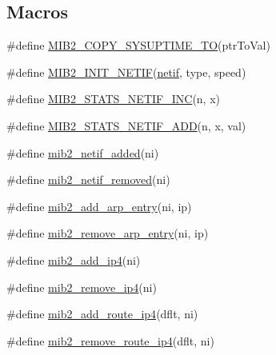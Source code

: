 \subsection*{Macros}
\begin{DoxyCompactItemize}
\item 
\#define \hyperlink{openmote-cc2538_2lwip_2src_2include_2lwip_2snmp_8h_abe6b270482ca9af07c029f3136d8ec9c}{M\+I\+B2\+\_\+\+C\+O\+P\+Y\+\_\+\+S\+Y\+S\+U\+P\+T\+I\+M\+E\+\_\+\+TO}(ptr\+To\+Val)
\item 
\#define \hyperlink{openmote-cc2538_2lwip_2src_2include_2lwip_2snmp_8h_a5be1b8cba1d67bf6e7f8851ec91b10f0}{M\+I\+B2\+\_\+\+I\+N\+I\+T\+\_\+\+N\+E\+T\+IF}(\hyperlink{structnetif}{netif},  type,  speed)
\item 
\#define \hyperlink{openmote-cc2538_2lwip_2src_2include_2lwip_2snmp_8h_a3c52caf566d37705c6547f2d025afd9f}{M\+I\+B2\+\_\+\+S\+T\+A\+T\+S\+\_\+\+N\+E\+T\+I\+F\+\_\+\+I\+NC}(n,  x)
\item 
\#define \hyperlink{openmote-cc2538_2lwip_2src_2include_2lwip_2snmp_8h_a05641438775014b7e13b9e55eba48bed}{M\+I\+B2\+\_\+\+S\+T\+A\+T\+S\+\_\+\+N\+E\+T\+I\+F\+\_\+\+A\+DD}(n,  x,  val)
\item 
\#define \hyperlink{openmote-cc2538_2lwip_2src_2include_2lwip_2snmp_8h_a08c13574be94c2bd589c476bd0ea1ba0}{mib2\+\_\+netif\+\_\+added}(ni)
\item 
\#define \hyperlink{openmote-cc2538_2lwip_2src_2include_2lwip_2snmp_8h_a8199a60f5794825ce5d9d03fa6d09ce8}{mib2\+\_\+netif\+\_\+removed}(ni)
\item 
\#define \hyperlink{openmote-cc2538_2lwip_2src_2include_2lwip_2snmp_8h_adb03de79d2e1fc600c78d8f72a757f34}{mib2\+\_\+add\+\_\+arp\+\_\+entry}(ni,  ip)
\item 
\#define \hyperlink{openmote-cc2538_2lwip_2src_2include_2lwip_2snmp_8h_a8f86f7f089ed2ecf4ed14aa01db3b173}{mib2\+\_\+remove\+\_\+arp\+\_\+entry}(ni,  ip)
\item 
\#define \hyperlink{openmote-cc2538_2lwip_2src_2include_2lwip_2snmp_8h_aef7dd50411354a73d3136682e620c29a}{mib2\+\_\+add\+\_\+ip4}(ni)
\item 
\#define \hyperlink{openmote-cc2538_2lwip_2src_2include_2lwip_2snmp_8h_adb3ddfac76153a97bbe02c220f8f85a0}{mib2\+\_\+remove\+\_\+ip4}(ni)
\item 
\#define \hyperlink{openmote-cc2538_2lwip_2src_2include_2lwip_2snmp_8h_a4fc7123213fe9bbf0fb743e953f24043}{mib2\+\_\+add\+\_\+route\+\_\+ip4}(dflt,  ni)
\item 
\#define \hyperlink{openmote-cc2538_2lwip_2src_2include_2lwip_2snmp_8h_aa3d83533068f4a497d6e29288973c9c3}{mib2\+\_\+remove\+\_\+route\+\_\+ip4}(dflt,  ni)

\end{DoxyCompactItemize}
